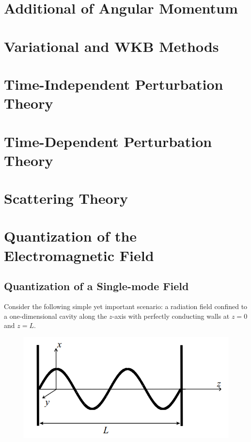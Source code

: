 \documentclass{book}
\theoremstyle{definition}
\begin{document}
\newpage



\section{Additional of Angular Momentum}


\newpage



\section{Variational and WKB Methods}



\newpage


\section{Time-Independent Perturbation Theory}


\newpage



\section{Time-Dependent Perturbation Theory}


\newpage


\section{Scattering Theory}


\newpage



\section{Quantization of the Electromagnetic Field}

\subsection{Quantization of a Single-mode Field}

Consider the following simple yet important scenario: a radiation field confined to a one-dimensional cavity along the $z$-axis with perfectly conducting walls at $z=0$ and $z=L$. 
\begin{figure}[!htb]
	\centering
	\includegraphics[scale=0.5]{em}
\end{figure}
\end{document}
